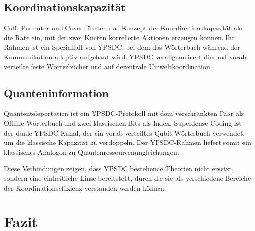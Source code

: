 \documentclass[12pt,a4paper]{article}
\theoremstyle{remark}
\begin{document}
	\subsection*{Koordinationskapazität}
	Cuff, Permuter und Cover \cite{Cuff2013} führten das Konzept der Koordinationskapazität als die Rate ein, mit der zwei Knoten korrelierte Aktionen erzeugen können. Ihr Rahmen ist ein Spezialfall von YPSDC, bei dem das Wörterbuch während der Kommunikation adaptiv aufgebaut wird. YPSDC verallgemeinert dies auf vorab verteilte feste Wörterbücher und auf dezentrale Umweltkoordination.
	
	\subsection*{Quanteninformation}
	Quantenteleportation \cite{Bennett1993} ist ein YPSDC-Protokoll mit dem verschränkten Paar als Offline-Wörterbuch und zwei klassischen Bits als Index. Superdense Coding ist der duale YPSDC-Kanal, der ein vorab verteiltes Qubit-Wörterbuch verwendet, um die klassische Kapazität zu verdoppeln. Der YPSDC-Rahmen liefert somit ein klassisches Analogon zu Quantenressourcenungleichungen.
	
	Diese Verbindungen zeigen, dass YPSDC bestehende Theorien nicht ersetzt, sondern eine einheitliche Linse bereitstellt, durch die sie als verschiedene Bereiche der Koordinationseffizienz verstanden werden können.
	
	\clearpage
	\section{Fazit}
	
\end{document}
